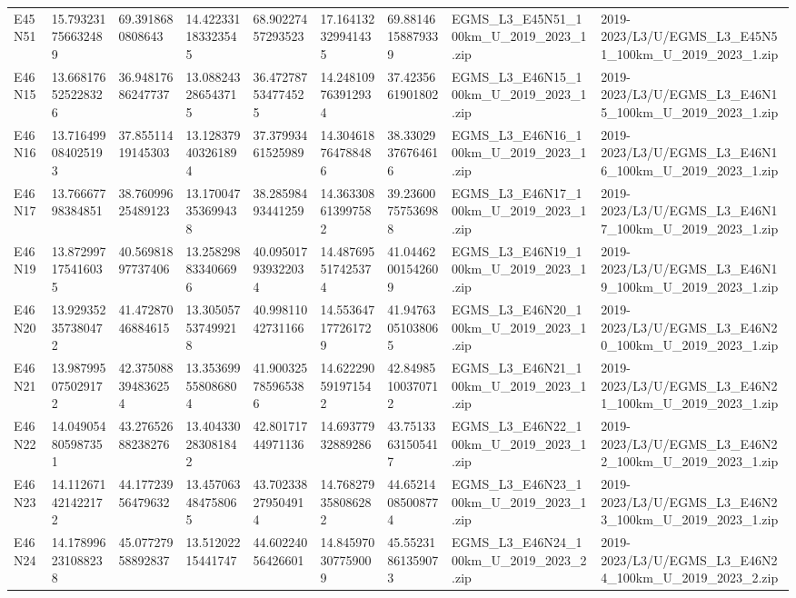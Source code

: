 \begin{landscape}
\begin{longtable}{lllllllll}
E45N51 & 15.793231756632489 & 69.3918680808643 & 14.422331183323545 & 68.90227457293523 & 17.164132329941435 & 69.88146158879339 & EGMS\_L3\_E45N51\_100km\_U\_2019\_2023\_1.zip & 2019-2023/L3/U/EGMS\_L3\_E45N51\_100km\_U\_2019\_2023\_1.zip \\
E46N15 & 13.668176525228326 & 36.94817686247737 & 13.088243286543715 & 36.472787534774525 & 14.248109763912934 & 37.4235661901802 & EGMS\_L3\_E46N15\_100km\_U\_2019\_2023\_1.zip & 2019-2023/L3/U/EGMS\_L3\_E46N15\_100km\_U\_2019\_2023\_1.zip \\
E46N16 & 13.716499084025193 & 37.85511419145303 & 13.128379403261894 & 37.37993461525989 & 14.304618764788486 & 38.33029376764616 & EGMS\_L3\_E46N16\_100km\_U\_2019\_2023\_1.zip & 2019-2023/L3/U/EGMS\_L3\_E46N16\_100km\_U\_2019\_2023\_1.zip \\
E46N17 & 13.76667798384851 & 38.76099625489123 & 13.170047353699438 & 38.28598493441259 & 14.363308613997582 & 39.23600757536988 & EGMS\_L3\_E46N17\_100km\_U\_2019\_2023\_1.zip & 2019-2023/L3/U/EGMS\_L3\_E46N17\_100km\_U\_2019\_2023\_1.zip \\
E46N19 & 13.872997175416035 & 40.56981897737406 & 13.258298833406696 & 40.095017939322034 & 14.487695517425374 & 41.04462001542609 & EGMS\_L3\_E46N19\_100km\_U\_2019\_2023\_1.zip & 2019-2023/L3/U/EGMS\_L3\_E46N19\_100km\_U\_2019\_2023\_1.zip \\
E46N20 & 13.929352357380472 & 41.47287046884615 & 13.305057537499218 & 40.99811042731166 & 14.553647177261729 & 41.94763051038065 & EGMS\_L3\_E46N20\_100km\_U\_2019\_2023\_1.zip & 2019-2023/L3/U/EGMS\_L3\_E46N20\_100km\_U\_2019\_2023\_1.zip \\
E46N21 & 13.987995075029172 & 42.375088394836254 & 13.353699558086804 & 41.900325785965386 & 14.622290591971542 & 42.84985100370712 & EGMS\_L3\_E46N21\_100km\_U\_2019\_2023\_1.zip & 2019-2023/L3/U/EGMS\_L3\_E46N21\_100km\_U\_2019\_2023\_1.zip \\
E46N22 & 14.049054805987351 & 43.27652688238276 & 13.404330283081842 & 42.80171744971136 & 14.69377932889286 & 43.75133631505417 & EGMS\_L3\_E46N22\_100km\_U\_2019\_2023\_1.zip & 2019-2023/L3/U/EGMS\_L3\_E46N22\_100km\_U\_2019\_2023\_1.zip \\
E46N23 & 14.112671421422172 & 44.17723956479632 & 13.457063484758065 & 43.702338279504914 & 14.768279358086282 & 44.65214085008774 & EGMS\_L3\_E46N23\_100km\_U\_2019\_2023\_1.zip & 2019-2023/L3/U/EGMS\_L3\_E46N23\_100km\_U\_2019\_2023\_1.zip \\
E46N24 & 14.178996231088238 & 45.07727958892837 & 13.51202215441747 & 44.60224056426601 & 14.845970307759009 & 45.55231861359073 & EGMS\_L3\_E46N24\_100km\_U\_2019\_2023\_2.zip & 2019-2023/L3/U/EGMS\_L3\_E46N24\_100km\_U\_2019\_2023\_2.zip \\

\end{longtable}
\end{landscape}

